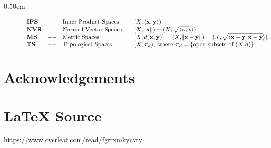 \documentclass{article}
\theoremstyle{definition}
\begin{document}
\bigskip
\setlength {\fboxsep} {0.50em}							%
\setlength {\fboxrule}{0.75pt}							%
\begin{figure}[H]										%
  \centering											%
   {							%
	 \resizebox{1.00\textwidth}{!} {
	    \begin{math}
          \begin{array}{llllll}
            {\bf IPS} &--& \text{Inner Product Spaces}	&&	(X,\langle {\bf x},{\bf y} \rangle)\\
            {\bf NVS} &--& \text{Normed Vector Spaces}	&&	(X,\norm{\bf x}) = (X,\sqrt{\langle \bf {x}, \bf{x}} \rangle) \\
            {\bf MS}  &--& \text{Metric Spaces}			&&	(X,d({\bf x},{\bf y})) = (X, \norm{{\bf x} - {\bf y}}) = 
                                                			(X,\sqrt{\langle {\bf x} - {\bf y},{\bf x} - {\bf y}}\rangle)\\
            {\bf TS}  &--& \text{Topological Spaces}	&&	(X, {\boldsymbol \tau_d)}, \text{ where ${\boldsymbol \tau_d = }$ 
            												\{open subsets of $(X, d)$\}}
           \end{array}
        \end{math}
     }
  }
\end{figure}
%
%
%
\bigskip
\section*{Acknowledgements}
%
%
\section*{\LaTeX \hspace{0.10 mm} Source}
\url{https://www.overleaf.com/read/fgrrxmkycvry}
%
%
%


%
%
\end{document}
